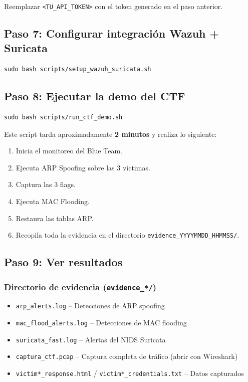 \documentclass[12pt,a4paper]{article}
\begin{document}
Reemplazar \texttt{<TU\_API\_TOKEN>} con el token generado en el paso anterior.

\subsection{Paso 7: Configurar integraci\'on Wazuh + Suricata}

\begin{lstlisting}
sudo bash scripts/setup_wazuh_suricata.sh
\end{lstlisting}

\subsection{Paso 8: Ejecutar la demo del CTF}

\begin{lstlisting}
sudo bash scripts/run_ctf_demo.sh
\end{lstlisting}

Este script tarda aproximadamente \textbf{2 minutos} y realiza lo siguiente:

\begin{enumerate}
    \item Inicia el monitoreo del Blue Team.
    \item Ejecuta ARP Spoofing sobre las 3 v\'ictimas.
    \item Captura las 3 flags.
    \item Ejecuta MAC Flooding.
    \item Restaura las tablas ARP.
    \item Recopila toda la evidencia en el directorio \texttt{evidence\_YYYYMMDD\_HHMMSS/}.
\end{enumerate}

\subsection{Paso 9: Ver resultados}

\subsubsection{Directorio de evidencia (\texttt{evidence\_*/})}

\begin{itemize}
    \item \texttt{arp\_alerts.log} -- Detecciones de ARP spoofing
    \item \texttt{mac\_flood\_alerts.log} -- Detecciones de MAC flooding
    \item \texttt{suricata\_fast.log} -- Alertas del NIDS Suricata
    \item \texttt{captura\_ctf.pcap} -- Captura completa de tr\'afico (abrir con Wireshark)
    \item \texttt{victim*\_response.html} / \texttt{victim*\_credentials.txt} -- Datos capturados
\end{itemize}
\end{document}
